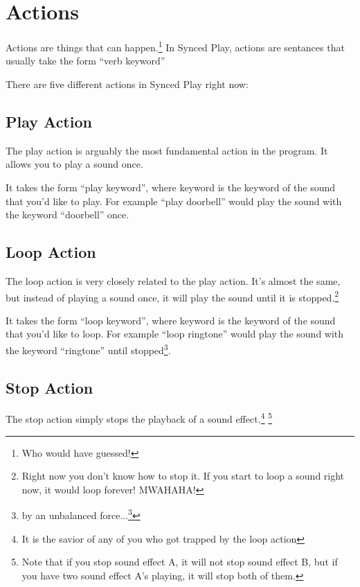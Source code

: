 \documentclass{article}
\begin{document}
\newpage

\section{Actions}

Actions are things that can happen.\footnote{Who would have guessed!} In
Synced Play, actions are sentances that usually take the form ``verb keyword''

There are five different actions in Synced Play right now:

\subsection{Play Action}

The play action is arguably the most fundamental action in the program.
It allows you to play a sound once.

It takes the form ``play keyword'', where keyword is the keyword of the 
sound that you'd like to play. For example ``play doorbell'' would play
the sound with the keyword ``doorbell'' once.

\subsection{Loop Action}

The loop action is very closely related to the play action. It's almost
the same, but instead of playing a sound once, it will play the sound until
it is stopped.\footnote{Right now you don't know how to stop it. If you
start to loop a sound right now, it would loop forever! MWAHAHA!}

It takes the form ``loop keyword'', where keyword is the keyword of the 
sound that you'd like to loop. For example ``loop ringtone'' would play
the sound with the keyword ``ringtone'' until stopped\footnote{by an
unbalanced force...\footnote{Oops, this isn't my physics homework!}}.

\subsection{Stop Action}

The stop action simply stops the playback of a sound effect.\footnote{It
is the savior of any of you who got trapped by the loop action} \footnote{
Note that if you stop sound effect A, it will not stop sound effect B,
but if you have two sound effect A's playing, it will stop both of them.}
\end{document}
